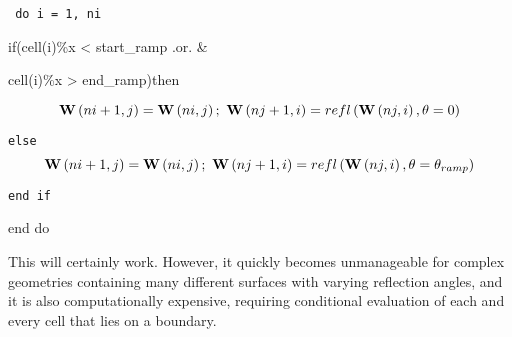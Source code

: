 {\tt
do i = 1, ni

if(cell(i)\%x < start\_ramp .or. \&

   cell(i)\%x > end\_ramp)then
}
\[{\bf{W}}\left( {ni + 1,j} \right) = {\bf{W}}\left( {ni,j} \right);\,\,{\bf{W}}\left( {nj + 1,i} \right) = refl\left( {{\bf{W}}\left( {nj,i} \right),\theta  = 0} \right)\]

{\tt else}
\[{\bf{W}}\left( {ni + 1,j} \right) = {\bf{W}}\left( {ni,j} \right);\,\,{\bf{W}}\left( {nj + 1,i} \right) = refl\left( {{\bf{W}}\left( {nj,i} \right),\theta  = {\theta _{ramp}}} \right)\]

{\tt end if

end do
}

This will certainly work. However, it quickly becomes unmanageable for complex geometries containing many different surfaces with varying reflection angles, and it is also computationally expensive, requiring conditional evaluation of each and every cell that lies on a boundary.

